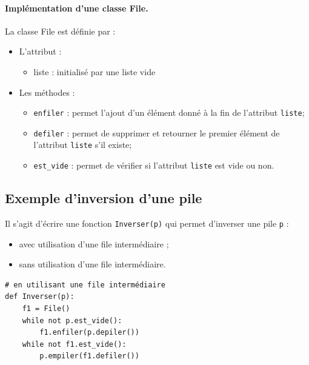 \documentclass[a4paper,11pt]{article}
\theoremstyle{mytheor}
\begin{document}
\noindent
\paragraph{Implémentation d'une classe File.}
La classe File est définie par :
\begin{itemize}
	\item L'attribut :
	\begin{itemize}
		
		\item liste : initialisé par une liste vide
		
	\end{itemize}
	
	\noindent
	\item Les méthodes :
	\begin{itemize}
		
		\item \texttt{enfiler} : permet l'ajout d'un élément donné à la fin de l'attribut \texttt{liste};
		
		\item \texttt{defiler} : permet de supprimer et retourner le premier élément de l’attribut \texttt{liste} s’il existe;
		
		\item \Verb!est_vide! : permet de vérifier si l'attribut \texttt{liste} est vide ou non.
	\end{itemize}
	
	\noindent
\end{itemize}



\subsection{Exemple d'inversion d'une pile}
Il s'agit d’écrire une fonction \texttt{Inverser(p)} qui permet d’inverser une pile \texttt{p} :
\begin{itemize}
	\item avec utilisation d'une file intermédiaire ;
	
	\item sans utilisation d'une file intermédiaire.
\end{itemize}


\begin{lstlisting}
# en utilisant une file intermédiaire
def Inverser(p):
	f1 = File()
	while not p.est_vide():
		f1.enfiler(p.depiler())
	while not f1.est_vide():
		p.empiler(f1.defiler())
\end{lstlisting}
\end{document}
